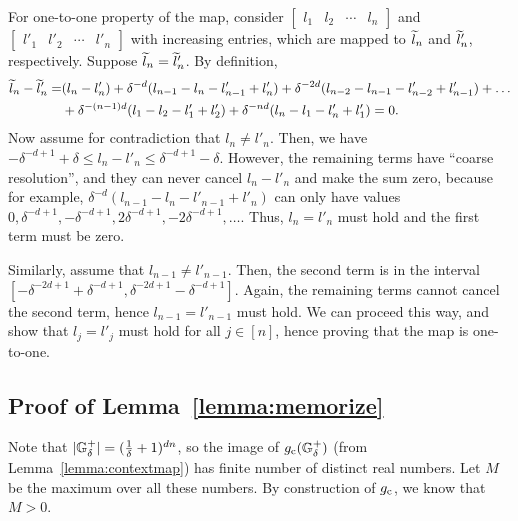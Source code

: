 For one-to-one property of the map, consider $\begin{bmatrix} l_1 & l_2 & \cdots & l_n \end{bmatrix}$ and $\begin{bmatrix} l'_1 & l'_2 & \cdots & l'_n \end{bmatrix}$ with increasing entries, which are mapped to $\widetilde{l}_n$ and $\widetilde{l}'_n$, respectively.
Suppose $\widetilde{l}_n = \widetilde{l}'_n$. By definition,
\begin{align*}
    \widetilde{l}_n - \widetilde{l}'_n
    =& (l_n - l'_n) + \delta^{-d} (l_{n-1} - l_n - l'_{n-1} + l'_n) 
    + \delta^{-2d} (l_{n-2} - l_{n-1} - l'_{n-2} + l'_{n-1}) + \dots
    \\&+ \delta^{-(n-1)d}(l_1-l_2-l'_1+l'_2) + \delta^{-nd} (l_n-l_1-l'_n+l'_1) = 0.
\end{align*}
Now assume for contradiction that $l_n \neq l'_n$. Then, we have $-\delta^{-d+1}+\delta \leq l_n - l'_n \leq \delta^{-d+1}-\delta$. However, the remaining terms have ``coarse resolution'', and they can never cancel $l_n - l'_n$ and make the sum zero, because for example, $\delta^{-d} (l_{n-1} - l_n - l'_{n-1} + l'_n)$ can only have values $0, \delta^{-d+1}, -\delta^{-d+1}, 2\delta^{-d+1}, -2\delta^{-d+1}, \dots$. Thus, $l_n = l'_n$ must hold and the first term must be zero.

Similarly, assume that $l_{n-1} \neq l'_{n-1}$. Then, the second term is in the interval $[-\delta^{-2d+1}+\delta^{-d+1}, \delta^{-2d+1}-\delta^{-d+1}]$.
Again, the remaining terms cannot cancel the second term, hence $l_{n-1} = l'_{n-1}$ must hold.
We can proceed this way, and show that $l_j = l'_j$ must hold for all $j \in [n]$, hence proving that the map is one-to-one.



\subsection{Proof of Lemma~\ref{lemma:memorize}}
Note that $|{\mathbb{G}}^+_{\delta}| = (\frac{1}{\delta}+1)^{dn}$, so the image of $g_{\rm c}({\mathbb{G}}^+_{\delta})$ (from Lemma~\ref{lemma:contextmap}) has finite number of distinct real numbers. Let $M$ be the maximum over all these numbers. By construction of $g_{\rm c}$, we know that $M>0$.

